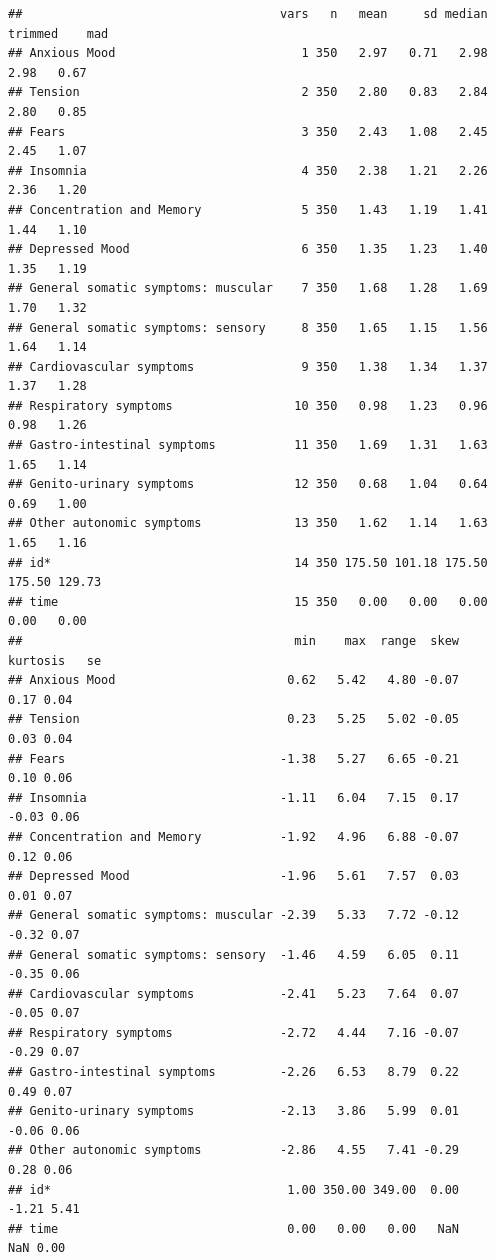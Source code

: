 \documentclass[
]{book}
\begin{document}
\begin{verbatim}
##                                    vars   n   mean     sd median trimmed    mad
## Anxious Mood                          1 350   2.97   0.71   2.98    2.98   0.67
## Tension                               2 350   2.80   0.83   2.84    2.80   0.85
## Fears                                 3 350   2.43   1.08   2.45    2.45   1.07
## Insomnia                              4 350   2.38   1.21   2.26    2.36   1.20
## Concentration and Memory              5 350   1.43   1.19   1.41    1.44   1.10
## Depressed Mood                        6 350   1.35   1.23   1.40    1.35   1.19
## General somatic symptoms: muscular    7 350   1.68   1.28   1.69    1.70   1.32
## General somatic symptoms: sensory     8 350   1.65   1.15   1.56    1.64   1.14
## Cardiovascular symptoms               9 350   1.38   1.34   1.37    1.37   1.28
## Respiratory symptoms                 10 350   0.98   1.23   0.96    0.98   1.26
## Gastro-intestinal symptoms           11 350   1.69   1.31   1.63    1.65   1.14
## Genito-urinary symptoms              12 350   0.68   1.04   0.64    0.69   1.00
## Other autonomic symptoms             13 350   1.62   1.14   1.63    1.65   1.16
## id*                                  14 350 175.50 101.18 175.50  175.50 129.73
## time                                 15 350   0.00   0.00   0.00    0.00   0.00
##                                      min    max  range  skew kurtosis   se
## Anxious Mood                        0.62   5.42   4.80 -0.07     0.17 0.04
## Tension                             0.23   5.25   5.02 -0.05     0.03 0.04
## Fears                              -1.38   5.27   6.65 -0.21     0.10 0.06
## Insomnia                           -1.11   6.04   7.15  0.17    -0.03 0.06
## Concentration and Memory           -1.92   4.96   6.88 -0.07     0.12 0.06
## Depressed Mood                     -1.96   5.61   7.57  0.03     0.01 0.07
## General somatic symptoms: muscular -2.39   5.33   7.72 -0.12    -0.32 0.07
## General somatic symptoms: sensory  -1.46   4.59   6.05  0.11    -0.35 0.06
## Cardiovascular symptoms            -2.41   5.23   7.64  0.07    -0.05 0.07
## Respiratory symptoms               -2.72   4.44   7.16 -0.07    -0.29 0.07
## Gastro-intestinal symptoms         -2.26   6.53   8.79  0.22     0.49 0.07
## Genito-urinary symptoms            -2.13   3.86   5.99  0.01    -0.06 0.06
## Other autonomic symptoms           -2.86   4.55   7.41 -0.29     0.28 0.06
## id*                                 1.00 350.00 349.00  0.00    -1.21 5.41
## time                                0.00   0.00   0.00   NaN      NaN 0.00
\end{verbatim}
\end{document}
